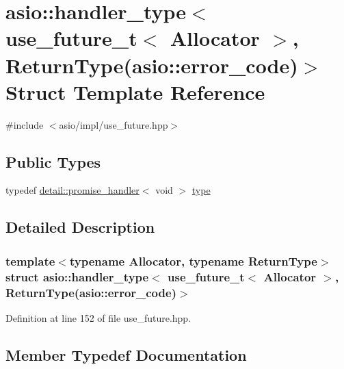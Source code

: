 \hypertarget{structasio_1_1handler__type_3_01use__future__t_3_01_allocator_01_4_00_01_01_01_01_01_01_01_01_01e03a2a25b6ea2f5e6fbc374eca266e19}{}\section{asio\+:\+:handler\+\_\+type$<$ use\+\_\+future\+\_\+t$<$ Allocator $>$, Return\+Type(asio\+:\+:error\+\_\+code)$>$ Struct Template Reference}
\label{structasio_1_1handler__type_3_01use__future__t_3_01_allocator_01_4_00_01_01_01_01_01_01_01_01_01e03a2a25b6ea2f5e6fbc374eca266e19}


{\ttfamily \#include $<$asio/impl/use\+\_\+future.\+hpp$>$}

\subsection*{Public Types}
\begin{DoxyCompactItemize}
\item 
typedef \hyperlink{classasio_1_1detail_1_1promise__handler}{detail\+::promise\+\_\+handler}$<$ void $>$ \hyperlink{structasio_1_1handler__type_3_01use__future__t_3_01_allocator_01_4_00_01_01_01_01_01_01_01_01_01e03a2a25b6ea2f5e6fbc374eca266e19_a8d732ade8f0fbf4f1950311ed58a1e4c}{type}
\end{DoxyCompactItemize}


\subsection{Detailed Description}
\subsubsection*{template$<$typename Allocator, typename Return\+Type$>$struct asio\+::handler\+\_\+type$<$ use\+\_\+future\+\_\+t$<$ Allocator $>$,           Return\+Type(asio\+::error\+\_\+code)$>$}



Definition at line 152 of file use\+\_\+future.\+hpp.



\subsection{Member Typedef Documentation}
\hypertarget{structasio_1_1handler__type_3_01use__future__t_3_01_allocator_01_4_00_01_01_01_01_01_01_01_01_01e03a2a25b6ea2f5e6fbc374eca266e19_a8d732ade8f0fbf4f1950311ed58a1e4c}{}
